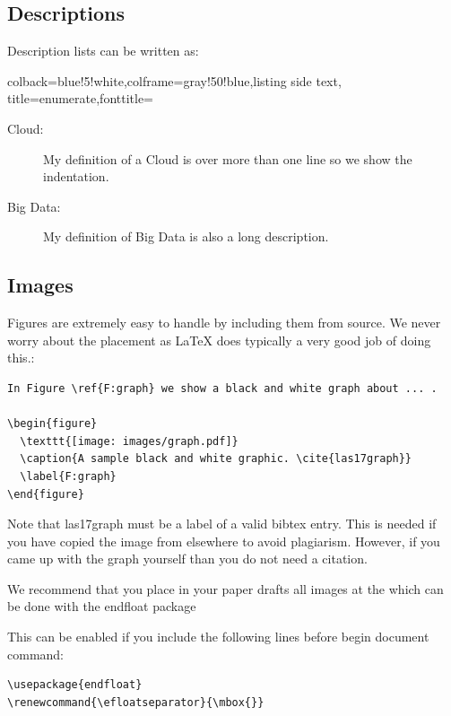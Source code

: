 \subsection{Descriptions}\label{descriptions}

Description lists can be written as:

\begin{tcblisting}{colback=blue!5!white,colframe=gray!50!blue,listing side text,
  title=enumerate,fonttitle=\bfseries}
\begin{description}
   \item[Cloud:] My definition of a Cloud is over more than one line
     so we show the indentation.
   \item[Big Data:] My definition of Big Data is also a long description.
\end{description}
\end{tcblisting} 




\subsection{Images}\label{images}

Figures are extremely easy to handle by including them from source. We
never worry about the placement as LaTeX does typically a very
good job of doing this.:

\begin{verbatim}
In Figure \ref{F:graph} we show a black and white graph about ... .

\begin{figure}
  \texttt{[image: images/graph.pdf]}
  \caption{A sample black and white graphic. \cite{las17graph}}
  \label{F:graph}
\end{figure}
\end{verbatim}

Note that las17graph must be a label of a valid bibtex entry. This is
needed if you have copied the image from elsewhere to avoid plagiarism.
However, if you came up with the graph yourself than you do not need a
citation.

We recommend that you place in your paper drafts all images at the which
can be done with the endfloat package

This can be enabled if you include the following lines before begin
document command:

\begin{verbatim}
\usepackage{endfloat}
\renewcommand{\efloatseparator}{\mbox{}} 


\end{verbatim}

